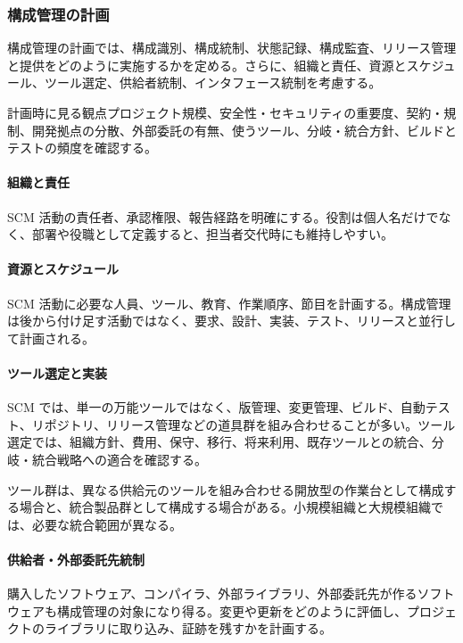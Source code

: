\subsubsection*{構成管理の計画}
構成管理の計画では、構成識別、構成統制、状態記録、構成監査、リリース管理と提供をどのように実施するかを定める。さらに、組織と責任、資源とスケジュール、ツール選定、供給者統制、インタフェース統制を考慮する。

\begin{notebox}{計画時に見る観点}プロジェクト規模、安全性・セキュリティの重要度、契約・規制、開発拠点の分散、外部委託の有無、使うツール、分岐・統合方針、ビルドとテストの頻度を確認する。\end{notebox}
\paragraph*{組織と責任}
SCM 活動の責任者、承認権限、報告経路を明確にする。役割は個人名だけでなく、部署や役職として定義すると、担当者交代時にも維持しやすい。

\paragraph*{資源とスケジュール}
SCM 活動に必要な人員、ツール、教育、作業順序、節目を計画する。構成管理は後から付け足す活動ではなく、要求、設計、実装、テスト、リリースと並行して計画される。

\paragraph*{ツール選定と実装}
SCM では、単一の万能ツールではなく、版管理、変更管理、ビルド、自動テスト、リポジトリ、リリース管理などの道具群を組み合わせることが多い。ツール選定では、組織方針、費用、保守、移行、将来利用、既存ツールとの統合、分岐・統合戦略への適合を確認する。

ツール群は、異なる供給元のツールを組み合わせる開放型の作業台として構成する場合と、統合製品群として構成する場合がある。小規模組織と大規模組織では、必要な統合範囲が異なる。

\paragraph*{供給者・外部委託先統制}
購入したソフトウェア、コンパイラ、外部ライブラリ、外部委託先が作るソフトウェアも構成管理の対象になり得る。変更や更新をどのように評価し、プロジェクトのライブラリに取り込み、証跡を残すかを計画する。

